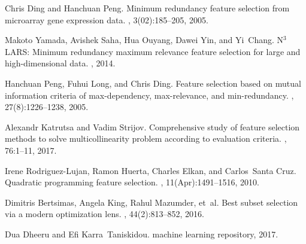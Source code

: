 \documentclass[
11pt,%
tightenlines,%
twoside,%
onecolumn,%
nofloats,%
nobibnotes,%
nofootinbib,%
superscriptaddress,%
noshowpacs,%
centertags]%
{revtex4}
\begin{document}
\begin{thebibliography}{10}
	Chris Ding and Hanchuan Peng.
	\newblock Minimum redundancy feature selection from microarray gene expression
	data.
	,
	3(02):185--205, 2005.
	
	Makoto Yamada, Avishek Saha, Hua Ouyang, Dawei Yin, and Yi~Chang.
	\newblock N$^3${LARS}: Minimum redundancy maximum relevance feature selection
	for large and high-dimensional data.
	, 2014.
	
	Hanchuan Peng, Fuhui Long, and Chris Ding.
	\newblock Feature selection based on mutual information criteria of
	max-dependency, max-relevance, and min-redundancy.
	,
	27(8):1226--1238, 2005.
	
	Alexandr Katrutsa and Vadim Strijov.
	\newblock Comprehensive study of feature selection methods to solve
	multicollinearity problem according to evaluation criteria.
	, 76:1--11, 2017.
	
	Irene Rodriguez-Lujan, Ramon Huerta, Charles Elkan, and Carlos~Santa Cruz.
	\newblock Quadratic programming feature selection.
	, 11(Apr):1491--1516, 2010.
	
	Dimitris Bertsimas, Angela King, Rahul Mazumder, et~al.
	\newblock Best subset selection via a modern optimization lens.
	, 44(2):813--852, 2016.
	
	Dua Dheeru and Efi Karra~Taniskidou.
	 machine learning repository, 2017.
	
\end{thebibliography}
\end{document}

